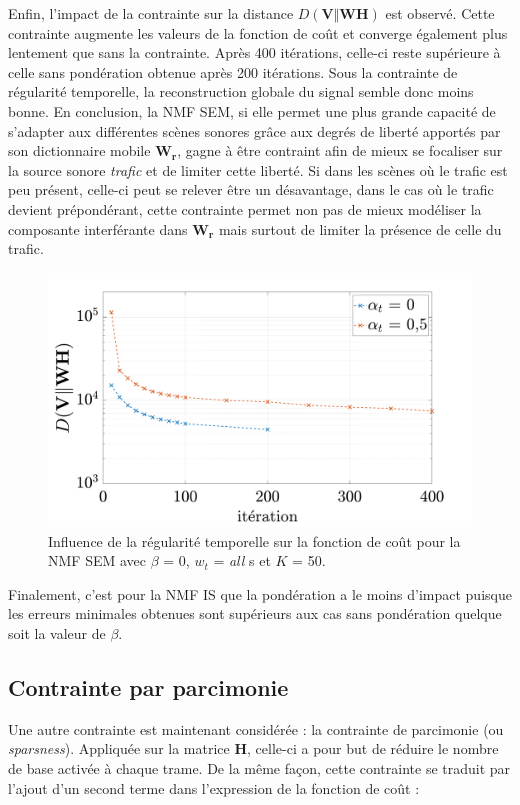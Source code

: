 Enfin, l'impact de la contrainte sur la distance $D(\mathbf{V}\Vert \mathbf{WH})$ est observé. Cette contrainte augmente les valeurs de la fonction de coût et converge également plus lentement que sans la contrainte. Après 400 itérations, celle-ci reste supérieure à celle sans pondération obtenue après 200 itérations. Sous la contrainte de régularité temporelle, la reconstruction globale du signal semble donc moins bonne. 
En conclusion, la NMF SEM, si elle permet une plus grande capacité de s'adapter aux différentes scènes sonores grâce aux degrés de liberté apportés par son dictionnaire mobile $\mathbf{W_r}$, gagne à être contraint afin de mieux se focaliser sur la source sonore \textit{trafic} et de limiter cette liberté. Si dans les scènes où le trafic est peu présent, celle-ci peut se relever être un désavantage, dans le cas où le trafic devient prépondérant, cette contrainte permet non pas de mieux modéliser la composante interférante dans $\mathbf{W_r}$ mais surtout de limiter la présence de celle du trafic.
 
\begin{figure}[h]
\centering
\includegraphics[width=.7\linewidth]{./figures/resultats/grafic_smooth_cost_beta0.pdf}
\caption{Influence de la régularité temporelle sur la fonction de coût pour la NMF SEM avec $\beta$ = 0, $w_t$ = \textit{all} s et $K$ = 50.}
\end{figure}

Finalement, c'est pour la NMF IS que la pondération a le moins d'impact puisque les erreurs minimales obtenues sont supérieurs aux cas sans pondération quelque soit la valeur de $\beta$. 

\subsection{Contrainte par parcimonie}\label{part:smoothSEM}

Une autre contrainte est maintenant considérée : la contrainte de parcimonie (ou \textit{sparsness}). Appliquée sur la matrice $\mathbf{H}$, celle-ci a pour but de réduire le nombre de base activée à chaque trame. De la même façon, cette contrainte se traduit par l'ajout d'un second terme dans l'expression de la fonction de coût : 

